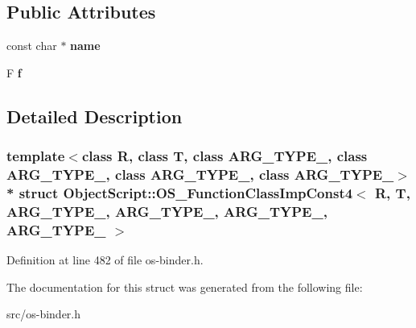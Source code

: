 \subsection*{Public Attributes}
\begin{DoxyCompactItemize}
\item 
const char $\ast$ {\bfseries name}\hypertarget{struct_object_script_1_1_o_s___function_class_imp_const4_af2dcd4fd047eb378ebe6e6a037e14c33}{}\label{struct_object_script_1_1_o_s___function_class_imp_const4_af2dcd4fd047eb378ebe6e6a037e14c33}

\item 
F {\bfseries f}\hypertarget{struct_object_script_1_1_o_s___function_class_imp_const4_a456af00b3d71d5e158703ba0ee03fb23}{}\label{struct_object_script_1_1_o_s___function_class_imp_const4_a456af00b3d71d5e158703ba0ee03fb23}

\end{DoxyCompactItemize}


\subsection{Detailed Description}
\subsubsection*{template$<$class R, class T, class A\+R\+G\+\_\+\+T\+Y\+P\+E\+\_, class A\+R\+G\+\_\+\+T\+Y\+P\+E\+\_, class A\+R\+G\+\_\+\+T\+Y\+P\+E\+\_, class A\+R\+G\+\_\+\+T\+Y\+P\+E\+\_$>$\\*
struct Object\+Script\+::\+O\+S\+\_\+\+Function\+Class\+Imp\+Const4$<$ R, T, A\+R\+G\+\_\+\+T\+Y\+P\+E\+\_, A\+R\+G\+\_\+\+T\+Y\+P\+E\+\_, A\+R\+G\+\_\+\+T\+Y\+P\+E\+\_, A\+R\+G\+\_\+\+T\+Y\+P\+E\+\_ $>$}



Definition at line 482 of file os-\/binder.\+h.



The documentation for this struct was generated from the following file\+:\begin{DoxyCompactItemize}
\item 
src/os-\/binder.\+h\end{DoxyCompactItemize}
